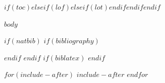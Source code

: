 \documentclass[a4paper,12pt]{$if(documentclass)$$documentclass$$else$report$endif$}
\newcommand{\refheadingword}{Tài liệu tham khảo}%
\newcommand{\refheadingword}{References}%
\begin{document}
$if(toc)$\newpage$else$$if(lof)$\newpage$else$$if(lot)$\newpage$endif$$endif$$endif$

$body$

$if(natbib)$
$if(bibliography)$

$endif$
$endif$
$if(biblatex)$
\printbibliography[title=\refheadingword]
$endif$

$for(include-after)$
$include-after$
$endfor$
\end{document}
